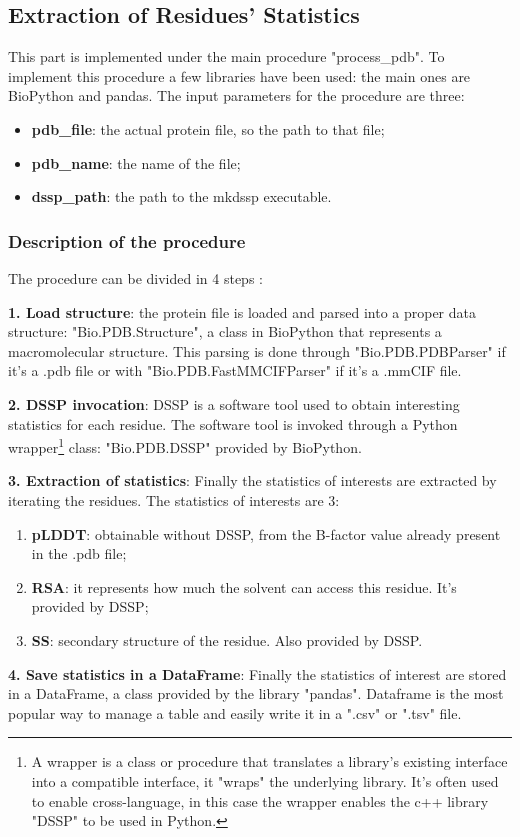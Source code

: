 \subsection{Extraction of Residues' Statistics}

This part is implemented under the main procedure "process\_pdb". To implement this procedure a few libraries have been used: the main ones are BioPython and pandas. The input parameters for the procedure are three:
\begin{itemize}
    \item \textbf{pdb\_file}: the actual protein file, so the path to that file;
    \item \textbf{pdb\_name}: the name of the file;
    \item \textbf{dssp\_path}: the path to the mkdssp executable.
\end{itemize}
\subsubsection{Description of the procedure}
The procedure can be divided in 4 steps :
\begin{description}
    \item \textbf{1. Load structure}: the protein file is loaded and parsed into a proper data structure: "Bio.PDB.Structure", a class in BioPython that represents a macromolecular structure. This parsing is done through "Bio.PDB.PDBParser" if it's a .pdb file or with "Bio.PDB.FastMMCIFParser" if it's a .mmCIF file.
    
    \item \textbf{2. DSSP invocation}: DSSP is a software tool used to obtain interesting statistics for each residue. The software tool is invoked through a Python wrapper\footnote{A wrapper is a class or procedure that translates a library's existing interface into a compatible interface, it "wraps" the underlying library. It's often used to enable cross-language, in this case the wrapper enables the c++ library "DSSP" to be used in Python.} class: "Bio.PDB.DSSP" provided by BioPython. 
    
    \item \textbf{3. Extraction of statistics}: Finally the statistics of interests are extracted by iterating the residues. The statistics of interests are 3: 
    \begin{enumerate}
        \item \textbf{pLDDT}: obtainable without DSSP, from the B-factor value already present in the .pdb file;
        \item \textbf{RSA}: it represents how much the solvent can access this residue. It's provided by DSSP;
        \item \textbf{SS}: secondary structure of the residue. Also provided by DSSP.
    \end{enumerate}
    
    
    \item \textbf{4. Save statistics in a DataFrame}: Finally the statistics of interest are stored in a DataFrame, a class provided by the library "pandas". Dataframe is the most popular way to manage a table and easily write it in a ".csv" or ".tsv" file. 
\end{description}


